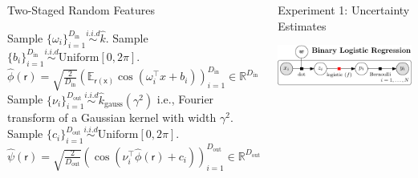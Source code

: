 \documentclass[english]{beamer}
\begin{document}
\begin{frame}
\begin{columns}[t]
\begin{block}{Two-Staged Random Features }
\begin{algorithmic}[1]
\STATE Sample  $\{ \omega_i \}_{i=1}^{D_\mathrm{in}} \overset{i.i.d}{\sim} \hat{k}$.
\STATE Sample $\{b_i\}_{i=1}^{D_\mathrm{in}} \overset{i.i.d}{\sim} \text{Uniform}[0, 2\pi] $.
\STATE $\hat{\phi}(\mathsf{r}) = \sqrt{\frac{2}{D_\mathrm{in}}} \left( \mathbb{E}_{\mathsf{r(x)}} 
\cos(\omega_{i}^{\top}x+b_{i} ) \right)_{i=1}^{D_\mathrm{in}} \in \mathbb{R}^{D_\mathrm{in}}$ \\
%
%
\STATE Sample $\{ \nu_i \}_{i=1}^{D_\mathrm{out}} \overset{i.i.d}{\sim}
\hat{k}_{\text{gauss}}(\gamma^{2})$
i.e., Fourier transform of a Gaussian kernel with width $\gamma^2$.
\STATE Sample $\{c_i\}_{i=1}^{D_\mathrm{out}} \overset{i.i.d}{\sim} \text{Uniform}[0, 2\pi] $.
\STATE $\hat{\psi}(\mathsf{r}) = \sqrt{\frac{2}{D_\mathrm{out}}} \left(  
\cos(\nu_{i}^{\top} \hat{\phi}(\mathsf{r}) + c_{i} ) \right)_{i=1}^{D_\mathrm{out}} \in 
\mathbb{R}^{D_\mathrm{out}}$
\end{algorithmic}

\end{block}

\begin{block}{ Experiment 1: Uncertainty Estimates}

\begin{center}
\includegraphics[width=20cm]{img/binlog_graph_title-crop}
\end{center}


\end{block}
\end{columns}
\end{frame}
\end{document}
